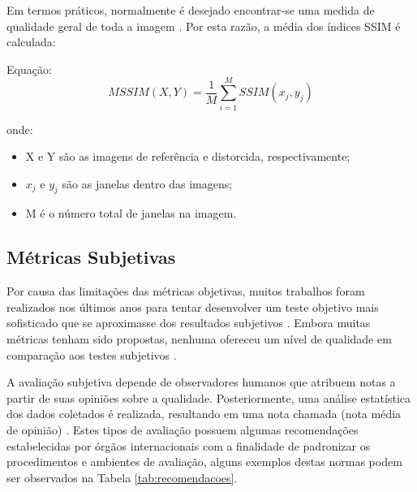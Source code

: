 Em termos práticos, normalmente é desejado encontrar-se uma medida de qualidade geral de toda a imagem \cite{wangbovik2004}. Por esta razão, a média dos índices SSIM é calculada:

Equação: \[MSSIM(X, Y) = \frac{1}{M} \sum_{i=1}^{M} SSIM(x_{j}, y_{j})\]

onde:
\begin{itemize}
	\item X e Y são as imagens de referência e distorcida, respectivamente;
	\item \(x_{j}\) e \(y_{j}\) são as janelas dentro das imagens;
	\item M é o número total de janelas na imagem.
\end{itemize}

\subsection{Métricas Subjetivas}

Por causa das limitações das métricas objetivas, muitos trabalhos foram realizados nos últimos anos para tentar desenvolver um teste objetivo mais sofisticado que se aproximasse dos resultados subjetivos \cite{watson1999, wangbovik2004}. Embora muitas métricas tenham sido propostas, nenhuma ofereceu um nível de qualidade em comparação aos testes subjetivos \cite{vqeg2003}.

A avaliação subjetiva depende de observadores humanos que atribuem notas a partir de suas opiniões sobre a qualidade. Posteriormente, uma análise estatística dos dados coletados é realizada, resultando em uma nota chamada  (nota média de opinião) \cite{itup930} \cite{albini}. Estes tipos de avaliação possuem algumas recomendações estabelecidas por órgãos internacionais com a finalidade de padronizar os procedimentos e ambientes de avaliação, alguns exemplos destas normas podem ser observados na Tabela \ref{tab:recomendacoes}.


